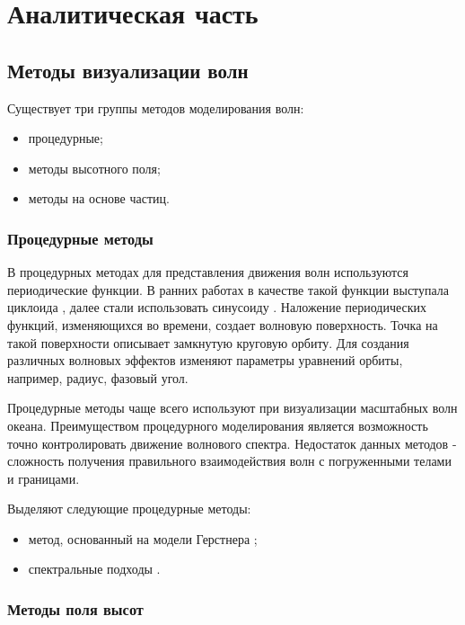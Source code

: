 \chapter{Аналитическая часть}

\section{Методы визуализации волн}

Существует три группы методов моделирования волн:

\begin{itemize}
    \item процедурные;
    \item методы высотного поля;
    \item методы на основе частиц.
\end{itemize}

\subsection{Процедурные методы}

В процедурных методах для представления движения волн используются периодические функции. В ранних работах в качестве такой функции выступала циклоида \cite{orbit-procedure}, далее стали использовать синусоиду \cite{spectrum-darles}. Наложение периодических функций, изменяющихся во времени, создает волновую поверхность. Точка на такой поверхности описывает замкнутую круговую орбиту. Для создания различных волновых эффектов изменяют параметры уравнений орбиты, например, радиус, фазовый угол.

Процедурные методы чаще всего используют при визуализации масштабных волн океана. Преимуществом процедурного моделирования является возможность точно контролировать движение волнового спектра. Недостаток данных методов - сложность получения правильного взаимодействия волн с погруженными телами и границами.  

Выделяют следующие процедурные методы:

\begin{itemize}
    \item метод, основанный на модели Герстнера \cite{orbit-procedure};
    \item спектральные подходы \cite{spectrum-tessendorf}\cite{spectrum-darles}.
\end{itemize}

\subsection{Методы поля высот}

